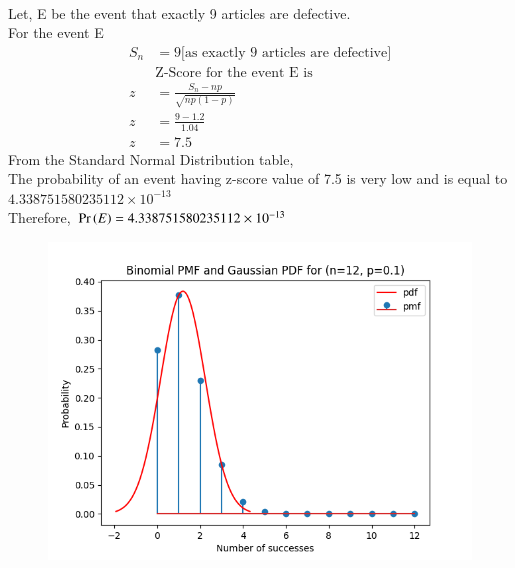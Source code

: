 \documentclass[journal,12pt,twocolumn]{IEEEtran}
\begin{document}
 \\Let, E be the event that exactly 9 articles are defective.
 \\For the event E
 \begin{align}
    S_n &= 9 \text{[as exactly 9 articles are defective]}\nonumber\\
    &\text{Z-Score for the event E is} \nonumber\\
    z &= \frac{S_n-np}{\sqrt{np(1-p)}}\\
    z &= \frac{9-1.2}{1.04}\nonumber\\
    z &= 7.5
    \end{align}
From the Standard Normal Distribution table,
\\The probability of an event having z-score value of 7.5 is very low and is equal to $4.338751580235112 \times 10^{-13}$
\\Therefore, $\Pr\left(E\right) = 4.338751580235112 \times 10^{-13}$
\begin{figure}[h]
\centering
\includegraphics[width=\columnwidth]{./figs/graph.png}
\end{figure}
\end{document}
